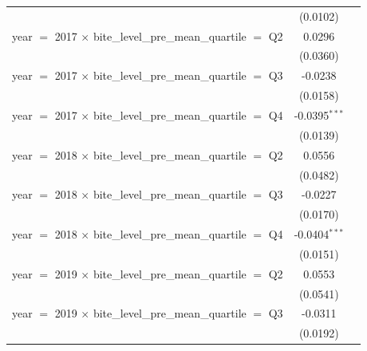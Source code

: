 \begin{tabular}{lcc}
                                                                              & (0.0102)                 &   \\   
   year $=$ 2017 $\times$ bite\_level\_pre\_mean\_quartile $=$ Q2             & 0.0296                   &   \\   
                                                                              & (0.0360)                 &   \\   
   year $=$ 2017 $\times$ bite\_level\_pre\_mean\_quartile $=$ Q3             & -0.0238                  &   \\   
                                                                              & (0.0158)                 &   \\   
   year $=$ 2017 $\times$ bite\_level\_pre\_mean\_quartile $=$ Q4             & -0.0395$^{***}$          &   \\   
                                                                              & (0.0139)                 &   \\   
   year $=$ 2018 $\times$ bite\_level\_pre\_mean\_quartile $=$ Q2             & 0.0556                   &   \\   
                                                                              & (0.0482)                 &   \\   
   year $=$ 2018 $\times$ bite\_level\_pre\_mean\_quartile $=$ Q3             & -0.0227                  &   \\   
                                                                              & (0.0170)                 &   \\   
   year $=$ 2018 $\times$ bite\_level\_pre\_mean\_quartile $=$ Q4             & -0.0404$^{***}$          &   \\   
                                                                              & (0.0151)                 &   \\   
   year $=$ 2019 $\times$ bite\_level\_pre\_mean\_quartile $=$ Q2             & 0.0553                   &   \\   
                                                                              & (0.0541)                 &   \\   
   year $=$ 2019 $\times$ bite\_level\_pre\_mean\_quartile $=$ Q3             & -0.0311                  &   \\   
                                                                              & (0.0192)                 &   \\   

\end{tabular}
